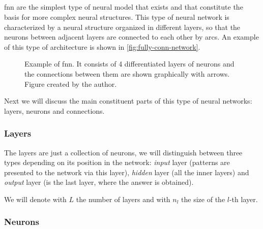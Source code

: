 \subsection{}\label{sec:fnn}

\Gls{fnn} are the simplest type of neural model that exists and that constitute
the basis for more complex neural structures. This type of neural network is
characterized by a neural structure organized in different layers, so that the
neurons between adjacent layers are connected to each other by arcs. An example
of this type of architecture is shown in \vref{fig:fully-conn-network}.

\begin{figure}[ht]
  \centering
  
  \caption[ topology]{Example of \acl{fnn}. It consists of 4
    differentiated layers of neurons and the connections between them are shown
    graphically with arrows. Figure created by the
    author.}\label{fig:fully-conn-network}
\end{figure}

Next we will discuss the main constituent parts of this type of neural
networks: layers, neurons and connections.

\subsubsection{Layers}

The layers are just a collection of neurons, we will distinguish between three
types depending on its position in the network: \emph{input} layer (patterns
are presented to the network via this layer), \emph{hidden} layer (all the
inner layers) and \emph{output} layer (is the last layer, where the answer is
obtained).

We will denote with \(L\) the number of layers and with \(n_l\) the size of the
\(l\)-th layer.

\subsubsection{Neurons}

